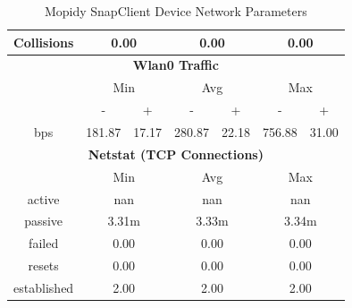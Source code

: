 \documentclass[11pt,a4paper]{scrreprt}
\begin{document}
\begin{table}[H]
\begin{tabular}{||c|c|c|c|c|c|c||}
    \hline
    Collisions & \multicolumn{2}{|c|}{0.00} & \multicolumn{2}{|c|}{0.00} & \multicolumn{2}{|c|}{0.00} \\
    \hline\hline
    \multicolumn{7}{|c|}{\textbf{Wlan0 Traffic}} \\
    \hline\hline
      & \multicolumn{2}{|c|}{Min} & \multicolumn{2}{|c|}{Avg} & \multicolumn{2}{|c|}{Max} \\
    \hline
      & - & + & - & + & - & + \\
    \hline
    bps  & 181.87 & 17.17 & 280.87 & 22.18 & 756.88 & 31.00 \\
    \hline\hline
    \multicolumn{7}{|c|}{\textbf{Netstat (TCP Connections)}} \\
    \hline\hline
      & \multicolumn{2}{|c|}{Min} & \multicolumn{2}{|c|}{Avg} & \multicolumn{2}{|c|}{Max} \\
    \hline
    active & \multicolumn{2}{|c|}{nan} & \multicolumn{2}{|c|}{nan} & \multicolumn{2}{|c|}{nan} \\
    \hline
    passive & \multicolumn{2}{|c|}{3.31m} & \multicolumn{2}{|c|}{3.33m} & \multicolumn{2}{|c|}{3.34m} \\
    \hline
    failed & \multicolumn{2}{|c|}{0.00} & \multicolumn{2}{|c|}{0.00} & \multicolumn{2}{|c|}{0.00} \\
    \hline
    resets & \multicolumn{2}{|c|}{0.00} & \multicolumn{2}{|c|}{0.00} & \multicolumn{2}{|c|}{0.00} \\
    \hline
    established & \multicolumn{2}{|c|}{2.00} & \multicolumn{2}{|c|}{2.00} & \multicolumn{2}{|c|}{2.00} \\
    \hline\hline
    \end{tabular}
    \caption{Mopidy SnapClient Device Network Parameters}
    \label{MopidyclientNetTab}
\end{table}
\end{document}
